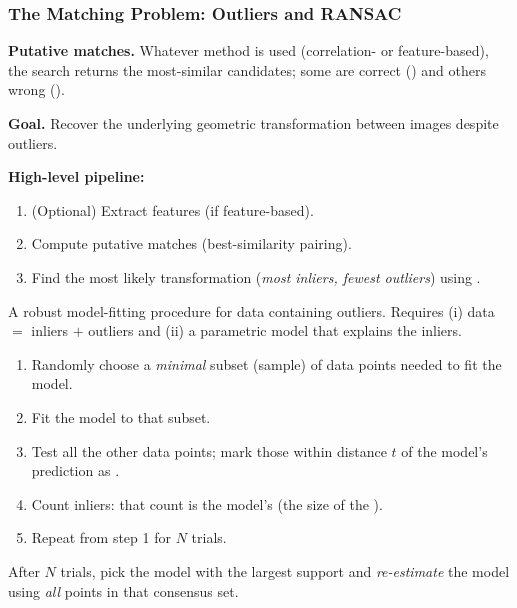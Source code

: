 \bigseparator

\subsubsection{The Matching Problem: Outliers and RANSAC}

\textbf{Putative matches.} Whatever method is used (correlation- or feature-based), the search returns the most-similar candidates; some are correct () and others wrong ().

\textbf{Goal.} Recover the underlying geometric transformation between images despite outliers.

\textbf{High-level pipeline:}
\begin{enumerate}
  \item (Optional) Extract features (if feature-based).
  \item Compute putative matches (best-similarity pairing).
  \item Find the most likely transformation (\emph{most inliers, fewest outliers}) using .
\end{enumerate}

\separator

\begin{defbox}
A robust model-fitting procedure for data containing outliers. Requires (i) data $=$ inliers $+$ outliers and (ii) a parametric model that explains the inliers.
\end{defbox}

\begin{thmbox}
\begin{enumerate}
  \item Randomly choose a \emph{minimal} subset (sample) of data points needed to fit the model.
  \item Fit the model to that subset.
  \item Test all the other data points; mark those within distance $t$ of the model's prediction as .
  \item Count inliers: that count is the model's  (the size of the ).
  \item Repeat from step 1 for $N$ trials.
\end{enumerate}
After $N$ trials, pick the model with the largest support and \emph{re-estimate} the model using \emph{all} points in that consensus set.
\end{thmbox}

